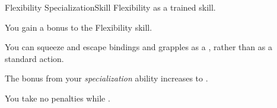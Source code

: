 
    \begin{feat}{Flexibility Specialization}{Skill}
        \featpre Flexibility as a trained skill.

         You gain a  bonus to the Flexibility skill.

         You can squeeze and escape bindings and grapples as a , rather than as a standard action.

         The bonus from your \textit{specialization} ability increases to .

         You take no penalties while \squeezing.
    \end{feat}

